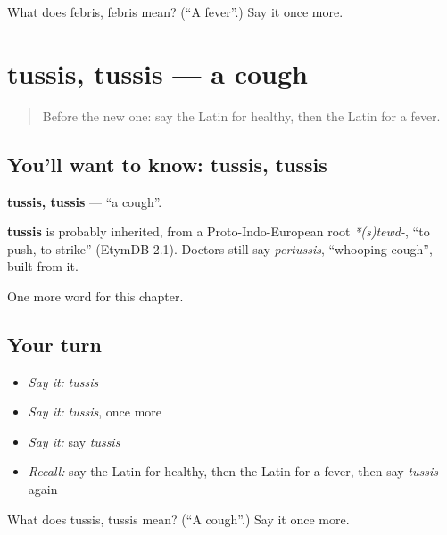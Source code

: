 \begin{tcolorbox}[breakable,colback=teal!4,colframe=teal!35!black,title={Before you move on}]
What does febris, febris mean? (\textquotedblleft{}A fever\textquotedblright{}.) Say it once more.
\end{tcolorbox}
\section[tussis, tussis]{tussis, tussis — a cough}

\label{lesson:LA-C67-tussis}



\begin{quote}
Before the new one: say the Latin for healthy, then the Latin for a fever.
\end{quote}

\subsection*{You'll want to know: tussis, tussis}
\textbf{tussis, tussis} — \textquotedblleft{}a cough\textquotedblright{}.

\begin{cousinweb}
\textbf{tussis} is probably inherited, from a Proto-Indo-European root \emph{*(s)tewd-}, \textquotedblleft{}to push, to strike\textquotedblright{} (EtymDB 2.1). Doctors still say \emph{pertussis}, \textquotedblleft{}whooping cough\textquotedblright{}, built from it.
\end{cousinweb}

\begin{grammarlens}[title={What you've built}]
One more word for this chapter.
\end{grammarlens}

\subsection*{Your turn}
\begin{itemize}
\raggedright
  \item \emph{Say it:} \emph{tussis}
  \item \emph{Say it:} \emph{tussis}, once more
  \item \emph{Say it:} say \emph{tussis}
  \item \emph{Recall:} say the Latin for healthy, then the Latin for a fever, then say \emph{tussis} again
\end{itemize}

\begin{tcolorbox}[breakable,colback=teal!4,colframe=teal!35!black,title={Before you move on}]
What does tussis, tussis mean? (\textquotedblleft{}A cough\textquotedblright{}.) Say it once more.
\end{tcolorbox}
